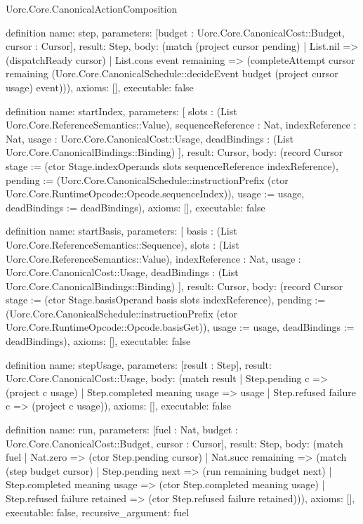 \begin{lexlean}{Uorc.Core.CanonicalActionComposition}
\begin{semanticmodule}
definition{
  name: step,
  parameters: [budget : Uorc.Core.CanonicalCost::Budget, cursor : Cursor],
  result: Step,
  body: (match (project cursor pending)
    | List.nil => (dispatchReady cursor)
    | List.cons event remaining => (completeAttempt cursor remaining (Uorc.Core.CanonicalSchedule::decideEvent budget (project cursor usage) event))),
  axioms: [],
  executable: false
}

definition{
  name: startIndex,
  parameters: [
    slots : (List Uorc.Core.ReferenceSemantics::Value),
    sequenceReference : Nat,
    indexReference : Nat,
    usage : Uorc.Core.CanonicalCost::Usage,
    deadBindings : (List Uorc.Core.CanonicalBindings::Binding)
  ],
  result: Cursor,
  body: (record Cursor {stage := (ctor Stage.indexOperands slots sequenceReference indexReference), pending := (Uorc.Core.CanonicalSchedule::instructionPrefix (ctor Uorc.Core.RuntimeOpcode::Opcode.sequenceIndex)), usage := usage, deadBindings := deadBindings}),
  axioms: [],
  executable: false
}

definition{
  name: startBasis,
  parameters: [
    basis : (List Uorc.Core.ReferenceSemantics::Sequence),
    slots : (List Uorc.Core.ReferenceSemantics::Value),
    indexReference : Nat,
    usage : Uorc.Core.CanonicalCost::Usage,
    deadBindings : (List Uorc.Core.CanonicalBindings::Binding)
  ],
  result: Cursor,
  body: (record Cursor {stage := (ctor Stage.basisOperand basis slots indexReference), pending := (Uorc.Core.CanonicalSchedule::instructionPrefix (ctor Uorc.Core.RuntimeOpcode::Opcode.basisGet)), usage := usage, deadBindings := deadBindings}),
  axioms: [],
  executable: false
}

definition{
  name: stepUsage,
  parameters: [result : Step],
  result: Uorc.Core.CanonicalCost::Usage,
  body: (match result
    | Step.pending c => (project c usage)
    | Step.completed meaning usage => usage
    | Step.refused failure c => (project c usage)),
  axioms: [],
  executable: false
}

definition{
  name: run,
  parameters: [fuel : Nat, budget : Uorc.Core.CanonicalCost::Budget, cursor : Cursor],
  result: Step,
  body: (match fuel
    | Nat.zero => (ctor Step.pending cursor)
    | Nat.succ remaining => (match (step budget cursor)
      | Step.pending next => (run remaining budget next)
      | Step.completed meaning usage => (ctor Step.completed meaning usage)
      | Step.refused failure retained => (ctor Step.refused failure retained))),
  axioms: [],
  executable: false,
  recursive_argument: fuel
}
\end{semanticmodule}
\end{lexlean}

